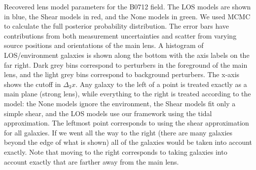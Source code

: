 \label{fig:RXJ1131} Recovered lens model parameters for the B0712 field. The LOS models are shown in blue, the Shear models in red, and the None models in green. We used MCMC to calculate the full posterior probability distribution. The error bars have contributions from both measurement uncertainties and scatter from varying source positions and orientations of the main lens. A histogram of LOS/environment galaxies is shown along the bottom with the axis labels on the far right. Dark grey bins correspond to perturbers in the foreground of the main lens, and the light grey bins correspond to background perturbers. The x-axis shows the cutoff in $\Delta_3 x$. Any galaxy to the left of a point is treated exactly as a main plane (strong lens), while everything to the right is treated according to the model: the None models ignore the environment, the Shear models fit only a simple shear, and the LOS models use our framework using the tidal approximation. The leftmost point corresponds to using the shear approximation for all galaxies. If we went all the way to the right (there are many galaxies beyond the edge of what is shown) all of the galaxies would be taken into account exactly. Note that moving to the right corresponds to taking galaxies into account exactly that are farther away from the main lens.
  